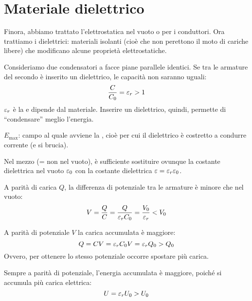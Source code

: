 \section{Materiale dielettrico}


Finora, abbiamo trattato l'elettrostatica nel vuoto o per i conduttori.
Ora trattiamo i dielettrici: materiali isolanti (cioè che non perettono il moto di cariche libere) che modificano alcune proprietà elettrostatiche.

Consideriamo due condensatori a facce piane parallele identici.
Se tra le armature del secondo è inserito un dielettrico, le capacità non saranno uguali:
\begin{equation}
    \frac{C}{C_0} = \varepsilon_r > 1
\end{equation}
$\varepsilon_r$ è la  e dipende dal materiale.
Inserire un dielettrico, quindi, permette di ``condensare'' meglio l'energia.

 $E_\mathrm{max}$: campo al quale avviene la , cioè per cui il dielettrico è costretto a condurre corrente (e si brucia).

Nel mezzo (= non nel vuoto), è sufficiente sostituire ovunque la costante dielettrica nel vuoto $\varepsilon_0$ con la costante dielettrica $\varepsilon = \varepsilon_r \varepsilon_0$.

A parità di carica $Q$, la differenza di potenziale tra le armature è minore che nel vuoto:
\begin{equation}
    V = \frac{Q}{C} = \frac{Q}{\varepsilon_r C_0} = \frac{V_0}{\varepsilon_r} < V_0
\end{equation}

A parità di potenziale $V$ la carica accumulata è maggiore:
\begin{equation}
    Q = CV = \varepsilon_r C_0 V = \varepsilon_r Q_0 > Q_0
\end{equation}
Ovvero, per ottenere lo stesso potenziale occorre spostare più carica.

Sempre a parità di potenziale, l'energia accumulata è maggiore, poiché si accumula più carica elettrica:
\begin{equation}
    U = \varepsilon_r U_0 > U_0
\end{equation}

